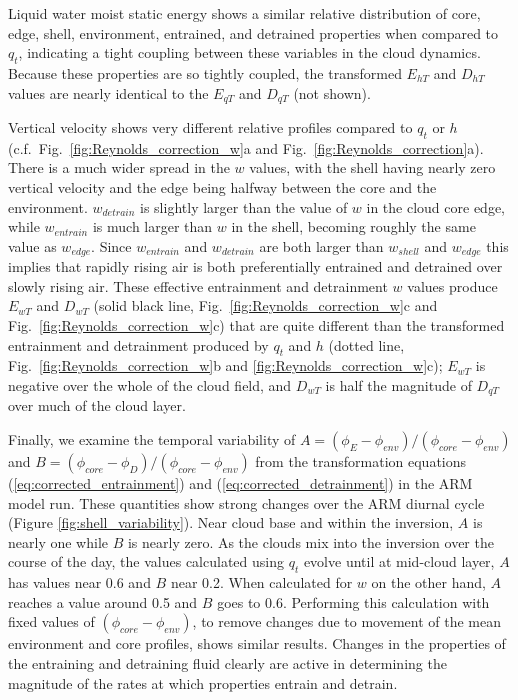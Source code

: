 \documentclass[12pt]{article}
\begin{document}
Liquid water moist static energy shows a similar relative distribution of 
core, edge, shell, environment, entrained, and detrained properties when 
compared to $q_t$, indicating a tight coupling between these variables in 
the cloud dynamics.  Because these properties are so tightly coupled, the
transformed $E_{hT}$ and $D_{hT}$ values are nearly identical to the $E_{qT}$ 
and $D_{qT}$ (not shown).

Vertical velocity shows very different relative profiles compared to
$q_t$ or $h$ (c.f.~Fig.~\ref{fig:Reynolds_correction_w}a and Fig.~\ref{fig:Reynolds_correction}a).  
There is a
much wider spread in the $w$ values, with the shell having nearly zero
vertical velocity and the edge being halfway between the core and the
environment.  $w_{detrain}$ is slightly larger than the value of $w$
in the cloud core edge, while $w_{entrain}$ is much larger than $w$ in
the shell, becoming roughly the same value as $w_{edge}$.  Since
$w_{entrain}$ and $w_{detrain}$ are both larger than $w_{shell}$ and
$w_{edge}$ this implies that rapidly rising air is both preferentially
entrained and detrained over slowly rising air.  These effective
entrainment and detrainment $w$ values produce $E_{wT}$ and $D_{wT}$
(solid black line, Fig.~\ref{fig:Reynolds_correction_w}c and Fig.~\ref{fig:Reynolds_correction_w}c)
that are quite different than the transformed entrainment and
detrainment produced by $q_t$ and $h$
(dotted line, Fig.~\ref{fig:Reynolds_correction_w}b and \ref{fig:Reynolds_correction_w}c); 
$E_{wT}$ is negative
over the whole of the cloud field, and $D_{wT}$ is half the magnitude
of $D_{qT}$ over much of the cloud layer.

Finally, we examine the temporal variability of 
$A = (\phi_E - \phi_{env})/(\phi_{core} - \phi_{env})$ and
$B = (\phi_{core} - \phi_D)/(\phi_{core} - \phi_{env})$ from the transformation
equations (\ref{eq:corrected_entrainment}) and (\ref{eq:corrected_detrainment})
in the ARM model run.  These quantities show strong changes over the ARM diurnal
cycle (Figure \ref{fig:shell_variability}).  Near cloud base and within the
inversion, $A$ is nearly one while $B$ is nearly zero.  As the clouds mix 
into the inversion over the course of the day, the values calculated using 
$q_t$ evolve until at mid-cloud layer, $A$ has values near 0.6 and $B$ near 
0.2.  When calculated for $w$ on the other hand, $A$ reaches a value around 
0.5 and $B$ goes to 0.6.  Performing this calculation with fixed values of 
$(\phi_{core} - \phi_{env})$, to remove changes due to movement of the mean
environment and core profiles, shows similar results.  Changes in the 
properties of the entraining and detraining fluid clearly are active in
determining the magnitude of the rates at which properties entrain and detrain.
\end{document}
